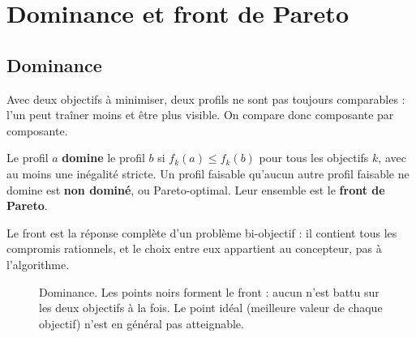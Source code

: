 \chapter{Dominance et front de Pareto}\label{ch:pareto}

\section{Dominance}
Avec deux objectifs à minimiser, deux profils ne sont pas toujours comparables : l'un peut traîner moins et être plus visible. On compare donc composante par composante.
\begin{definition}
Le profil $a$ \textbf{domine} le profil $b$ si $f_k(a)\le f_k(b)$ pour tous les objectifs $k$, avec au moins une inégalité stricte. Un profil faisable qu'aucun autre profil faisable ne domine est \textbf{non dominé}, ou Pareto-optimal. Leur ensemble est le \textbf{front de Pareto}.
\end{definition}
Le front est la réponse complète d'un problème bi-objectif : il contient tous les compromis rationnels, et le choix entre eux appartient au concepteur, pas à l'algorithme.

\begin{figure}[htbp]
\centering
{}
\caption{Dominance. Les points noirs forment le front : aucun n'est battu sur les deux objectifs à la fois. Le point idéal (meilleure valeur de chaque objectif) n'est en général pas atteignable.}\label{fig:dominance}
\end{figure}

